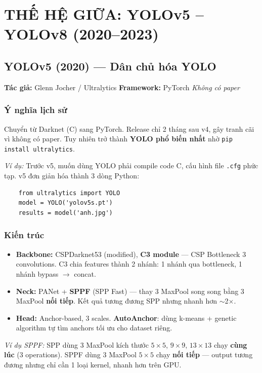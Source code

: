 \chapter{THẾ HỆ GIỮA: YOLOv5 -- YOLOv8 (2020--2023)}

\section{YOLOv5 (2020) --- Dân chủ hóa YOLO}
\textbf{Tác giả:} Glenn Jocher / Ultralytics \hfill \textbf{Framework:} PyTorch \hfill \textit{Không có paper}

\subsection{Ý nghĩa lịch sử}
Chuyển từ Darknet (C) sang PyTorch. Release chỉ 2 tháng sau v4, gây tranh cãi vì không có paper. Tuy nhiên trở thành \textbf{YOLO phổ biến nhất} nhờ \texttt{pip install ultralytics}.

\textit{Ví dụ:} Trước v5, muốn dùng YOLO phải compile code C, cấu hình file \texttt{.cfg} phức tạp. v5 đơn giản hóa thành 3 dòng Python:
\begin{verbatim}
    from ultralytics import YOLO
    model = YOLO('yolov5s.pt')
    results = model('anh.jpg')
\end{verbatim}

\subsection{Kiến trúc}
\begin{itemize}
    \item \textbf{Backbone:} CSPDarknet53 (modified), \textbf{C3 module} --- CSP Bottleneck 3 convolutions. C3 chia features thành 2 nhánh: 1 nhánh qua bottleneck, 1 nhánh bypass $\rightarrow$ concat.
    \item \textbf{Neck:} PANet + \textbf{SPPF} (SPP Fast) --- thay 3 MaxPool song song bằng 3 MaxPool \textbf{nối tiếp}. Kết quả tương đương SPP nhưng nhanh hơn $\sim$2$\times$.
    \item \textbf{Head:} Anchor-based, 3 scales. \textbf{AutoAnchor}: dùng k-means + genetic algorithm tự tìm anchors tối ưu cho dataset riêng.
\end{itemize}

\textit{Ví dụ SPPF:} SPP dùng 3 MaxPool kích thước $5\times5$, $9\times9$, $13\times13$ chạy \textbf{cùng lúc} (3 operations). SPPF dùng 3 MaxPool $5\times5$ chạy \textbf{nối tiếp} --- output tương đương nhưng chỉ cần 1 loại kernel, nhanh hơn trên GPU.

